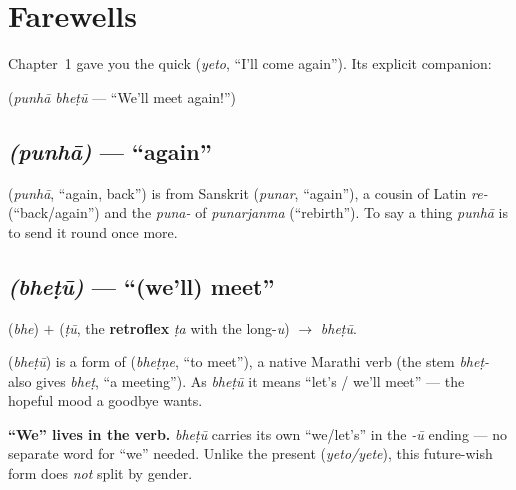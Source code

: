 \chapter{Farewells}
\label{ch:farewells}

Chapter~1 gave you the quick  (\emph{yeto}, ``I'll come again''). Its
explicit companion:

\begin{center}
 \quad(\emph{punh\=a bhe\d{t}\=u} --- ``We'll meet again!'')
\end{center}

\section{ \emph{(punh\=a)} --- ``again''}
\label{lesson:punha}

\begin{cousinweb}
 (\emph{punh\=a}, ``again, back'') is from Sanskrit 
(\emph{punar}, ``again''), a cousin of Latin \emph{re-} (``back/again'') and the
\emph{puna-} of \emph{punarjanma} (``rebirth''). To say a thing \emph{punh\=a} is
to send it round once more.
\end{cousinweb}

\section{ \emph{(bhe\d{t}\=u)} --- ``(we'll) meet''}
\label{lesson:bhetu}

\begin{sounds}
 (\emph{bhe}) $+$  (\emph{\d{t}\=u}, the \textbf{retroflex} 
\emph{\d{t}a} with the long-\emph{u}) $\to$ \emph{bhe\d{t}\=u}.
\end{sounds}

\begin{cousinweb}
 (\emph{bhe\d{t}\=u}) is a form of  (\emph{bhe\d{t}\d{n}e},
``to meet''), a native Marathi verb (the stem \emph{bhe\d{t}-} also gives
\emph{bhe\d{t}}, ``a meeting''). As \emph{bhe\d{t}\=u} it means ``let's / we'll
meet'' --- the hopeful mood a goodbye wants.
\end{cousinweb}

\begin{grammarlens}
\textbf{``We'' lives in the verb.} \emph{bhe\d{t}\=u} carries its own ``we/let's''
in the \emph{-\=u} ending --- no separate word for ``we'' needed. Unlike the
present (\emph{yeto/yete}), this future-wish form does \emph{not} split by gender.
\end{grammarlens}

